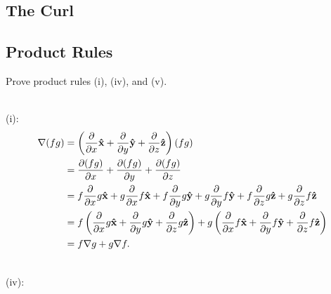             \subsection{The Curl}
            \subsection{Product Rules}
            \begin{prob}[1.21]
                Prove product rules (i), (iv), and (v).
            \end{prob}
            \begin{sol}[1.21] ~\\
                (i):
                \begin{equation}
                    \begin{aligned}
                        \nabla(fg)&=\left(\frac{\partial }{\partial x}\mathbf{\hat{x}} + \frac{\partial }{\partial y}\mathbf{\hat{y}} + \frac{\partial }{\partial z}\mathbf{\hat{z}}\right)(fg) \\
                            &=\frac{\partial (fg)}{\partial x} + \frac{\partial (fg)}{\partial y} + \frac{\partial (fg)}{\partial z} \\
                            &=f\frac{\partial }{\partial x}g\mathbf{\hat{x}} + g\frac{\partial }{\partial x}f\mathbf{\hat{x}} + f\frac{\partial }{\partial y}g\mathbf{\hat{y}} 
                                + g\frac{\partial }{\partial y}f\mathbf{\hat{y}} + f\frac{\partial }{\partial z}g\mathbf{\hat{z}} + g\frac{\partial }{\partial z}f\mathbf{\hat{z}} \\
                            &=f\left(\frac{\partial }{\partial x}g\mathbf{\hat{x}} + \frac{\partial }{\partial y}g\mathbf{\hat{y}} + \frac{\partial }{\partial z}g\mathbf{\hat{z}}\right) 
                                + g\left(\frac{\partial }{\partial x}f\mathbf{\hat{x}} + \frac{\partial }{\partial y}f\mathbf{\hat{y}} + \frac{\partial }{\partial z}f\mathbf{\hat{z}}\right) \\
                            &=f \nabla g + g \nabla f.
                    \end{aligned}
                \end{equation}
            \end{sol}
            ~\\
                (iv):
